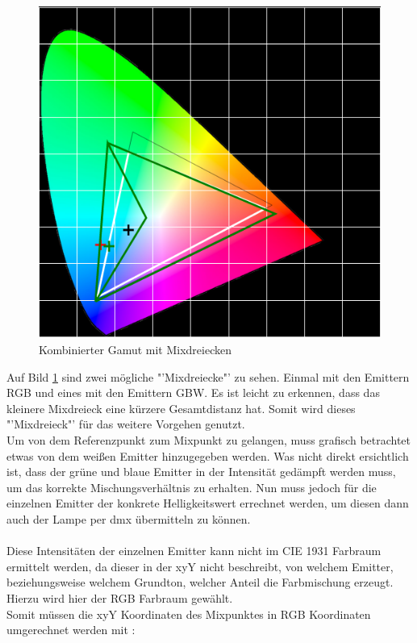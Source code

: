 \documentclass[11pt]{scrartcl}
\begin{document}
\begin{figure}[H]
    \begin{center}
        \includegraphics[width=.8\textwidth]{images/combined_gamut_with_mix_triangles_cyan.png}
    \end{center}
    \caption{Kombinierter Gamut mit Mixdreiecken}\label{fig:triangleCombined}
\end{figure}
\noindent
Auf Bild \ref{fig:triangleCombined} sind zwei mögliche "'Mixdreiecke"' zu sehen. Einmal mit den Emittern RGB und eines mit den Emittern GBW. Es ist leicht
zu erkennen, dass das kleinere Mixdreieck eine kürzere Gesamtdistanz hat. Somit wird dieses "'Mixdreieck"' für das weitere Vorgehen genutzt.\\
Um von dem Referenzpunkt zum Mixpunkt zu gelangen, muss grafisch betrachtet etwas von dem weißen Emitter hinzugegeben werden. Was nicht direkt ersichtlich
ist, dass der grüne und blaue Emitter in der Intensität gedämpft werden muss, um das korrekte Mischungsverhältnis zu erhalten. Nun muss jedoch für die
einzelnen Emitter der konkrete Helligkeitswert errechnet werden, um diesen dann auch der Lampe per \ac{dmx} übermitteln zu können.\\
\\
Diese Intensitäten der einzelnen Emitter kann nicht im CIE 1931 Farbraum ermittelt werden, da dieser in der xyY nicht beschreibt, von welchem Emitter,
beziehungsweise welchem Grundton, welcher Anteil die Farbmischung erzeugt. Hierzu wird hier der RGB Farbraum gewählt.\\
Somit müssen die xyY Koordinaten des Mixpunktes in RGB Koordinaten umgerechnet werden mit \cite{lindbloom}:
\end{document}
